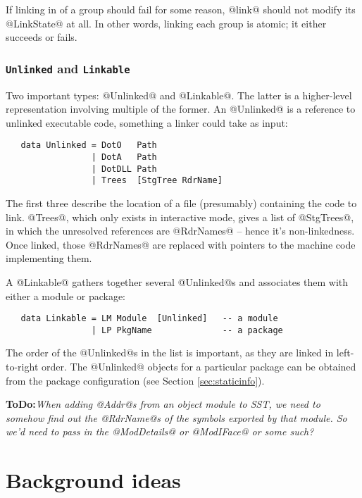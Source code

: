 \documentclass[11pt]{article}
\newcommand{\ToDo}[1]{{{\bf ToDo:}\sl #1}}
\begin{document}
If linking in of a group should fail for some reason, @link@ should
not modify its @LinkState@ at all.  In other words, linking each group
is atomic; it either succeeds or fails.

\subsubsection*{\mbox{\tt Unlinked} and \mbox{\tt Linkable}}

Two important types: @Unlinked@ and @Linkable@.  The latter is a 
higher-level representation involving multiple of the former.
An @Unlinked@ is a reference to unlinked executable code, something
a linker could take as input:

\begin{verbatim}
   data Unlinked = DotO   Path
                 | DotA   Path            
                 | DotDLL Path
                 | Trees  [StgTree RdrName]
\end{verbatim}

The first three describe the location of a file (presumably)
containing the code to link.  @Trees@, which only exists in
interactive mode, gives a list of @StgTrees@, in which the unresolved
references are @RdrNames@ -- hence it's non-linkedness.  Once linked,
those @RdrNames@ are replaced with pointers to the machine code
implementing them.

A @Linkable@ gathers together several @Unlinked@s and associates them
with either a module or package:

\begin{verbatim}
   data Linkable = LM Module  [Unlinked]   -- a module
                 | LP PkgName              -- a package
\end{verbatim}

The order of the @Unlinked@s in the list is important, as
they are linked in left-to-right order.  The @Unlinked@ objects for a
particular package can be obtained from the package configuration (see
Section \ref{sec:staticinfo}).

\ToDo{When adding @Addr@s from an object module to SST, we need to
      somehow find out the @RdrName@s of the symbols exported by that
      module. 
      So we'd need to pass in the @ModDetails@ or @ModIFace@ or some such?}



\section{Background ideas}
\end{document}
